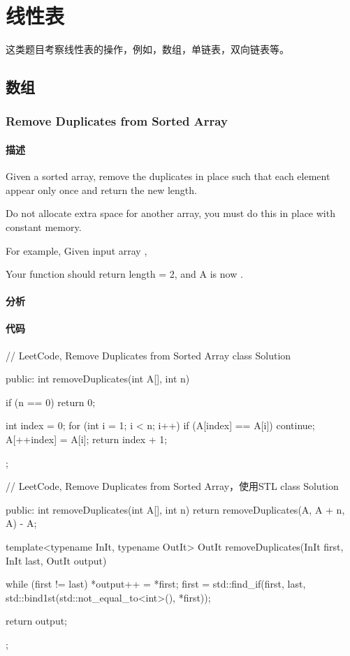 \chapter{线性表}
这类题目考察线性表的操作，例如，数组，单链表，双向链表等。


\section{数组} %


\subsection{Remove Duplicates from Sorted Array}
\label{sec:remove-duplicates-from-sorted-array}


\subsubsection{描述}
Given a sorted array, remove the duplicates in place such that each element appear only once and return the new length.

Do not allocate extra space for another array, you must do this in place with constant memory.

For example, Given input array ,

Your function should return length = 2, and A is now \code{[1,2]}.


\subsubsection{分析}



\subsubsection{代码}
\begin{Code}
// LeetCode, Remove Duplicates from Sorted Array
class Solution {
public:
    int removeDuplicates(int A[], int n) {
        if (n == 0) return 0;

        int index = 0;
        for (int i = 1; i < n; i++) {
            if (A[index] == A[i]) continue;
            A[++index] = A[i];
        }
        return index + 1;
    }
};
\end{Code}


\begin{Code}
// LeetCode, Remove Duplicates from Sorted Array，使用STL
class Solution {
public:
    int removeDuplicates(int A[], int n) {
        return removeDuplicates(A, A + n, A) - A;
    }

    template<typename InIt, typename OutIt>
    OutIt removeDuplicates(InIt first, InIt last, OutIt output) {
        while (first != last) {
            *output++ = *first;
            first = std::find_if(first, last,
                    std::bind1st(std::not_equal_to<int>(), *first));
        }

        return output;
    }
};
\end{Code}


